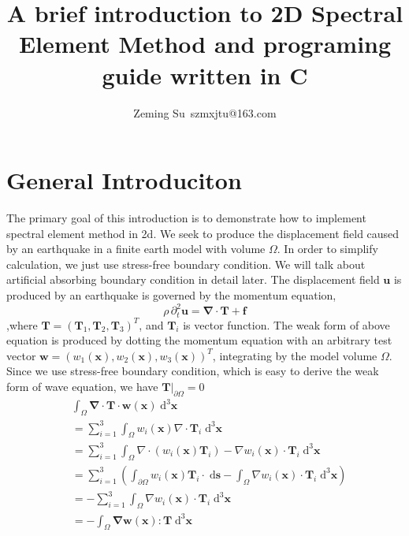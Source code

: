 \documentclass{article}
\title{A brief introduction to 2D Spectral Element Method and programing guide written in C}
\author{Zeming Su\ szmxjtu@163.com}
\begin{document}
  \maketitle
    \titlepage

  \section{General Introduciton}
  The primary goal of this introduction is to demonstrate how to implement spectral element method in 2d. We seek to produce the displacement field caused by an earthquake in a finite earth model with volume $\Omega$. In order to simplify calculation, we just use stress-free boundary condition.  We will  talk about artificial absorbing  boundary condition in detail later.
  The displacement field $\boldsymbol{u}$ is produced by an earthquake is governed by the momentum equation,
  \begin{equation}
  \rho\,\partial_t^2\boldsymbol{u}=\boldsymbol{\nabla}\cdot\boldsymbol{T}+\boldsymbol{f}
  \end{equation}
  ,where $\boldsymbol T =(\boldsymbol T_1,\boldsymbol T_2,\boldsymbol T_3)^T$, and $\boldsymbol T_i$ is vector function.
  The weak form of above equation is produced by dotting the momentum equation with an arbitrary test vector $\boldsymbol{w}=(w_1(\boldsymbol x),w_2(\boldsymbol x),w_3(\boldsymbol x))^T $, integrating by the model volume $\Omega$. Since we use stress-free boundary condition, which is easy to derive the weak form of wave equation, we have $\boldsymbol T|_{\partial \Omega} = 0$
  \begin{equation}
  \begin{aligned}
  &\int_\Omega \boldsymbol{\nabla}\cdot\boldsymbol{T}\cdot\boldsymbol w(\boldsymbol{x})\;\mathrm{d}^3\boldsymbol{x}\\
  & = \sum _{i=1}^3\int_\Omega w_i(\boldsymbol{x})\nabla\cdot\boldsymbol{T}_i\;\mathrm{d}^3\boldsymbol{x}\\
  & = \sum_{i=1}^3\int_\Omega \nabla\cdot(w_i(\boldsymbol{x})\boldsymbol{T}_i) - \nabla w_i(\boldsymbol x) \cdot\boldsymbol T_i\;\mathrm{d}^3\boldsymbol{x}\\
  & = \sum_{i=1}^3\left(\int_{\partial\Omega} w_i(\boldsymbol{x})\boldsymbol T_i \cdot \;\mathrm{d}\boldsymbol{s}-\int_\Omega\nabla w_i(\boldsymbol x) \cdot\boldsymbol T_i\;\mathrm{d}^3\boldsymbol{x} \right)\\
  & = -\sum_{i=1}^3\int_\Omega\nabla w_i(\boldsymbol x) \cdot\boldsymbol T_i\;\mathrm{d}^3\boldsymbol{x}\\
  & = -\int_\Omega \boldsymbol{\nabla}\boldsymbol w(\boldsymbol x): \boldsymbol T\;\mathrm{d}^3\boldsymbol x
  \end{aligned}
  \end{equation}
\end{document}
